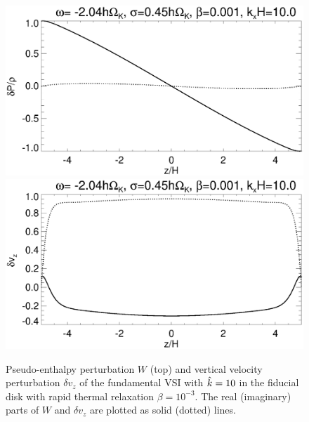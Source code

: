 \begin{figure}
  \includegraphics[width=\linewidth,clip=true,trim=0cm 1.75cm 0cm
  0cm]{figures/eigenvectorW_iso} 
  \includegraphics[width=\linewidth,clip=true,trim=0cm 0cm 0cm
  1cm]{figures/eigenvectorvz_iso}
  \caption{Pseudo-enthalpy perturbation $W$ (top) and vertical velocity
    perturbation $\delta v_z$ of the fundamental VSI with 
    $\hat{k}=10$ in the fiducial disk with rapid thermal relaxation $\beta=10^{-3}$. The real  
    (imaginary) parts of $W$ and $\delta v_z$ are plotted as solid 
    (dotted) lines.  
    \label{lowfreq_eigenfunc}
  }
\end{figure}

